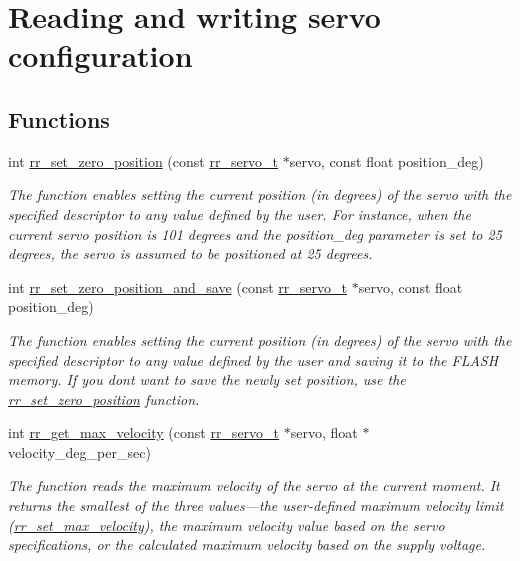 \hypertarget{group___config}{}\section{Reading and writing servo configuration}
\label{group___config}
\subsection*{Functions}
\begin{DoxyCompactItemize}
\item 
int \hyperlink{group___config_gab68e78b8a0d2a9ac38b9a72d78acab85}{rr\+\_\+set\+\_\+zero\+\_\+position} (const \hyperlink{structrr__servo__t}{rr\+\_\+servo\+\_\+t} $\ast$servo, const float position\+\_\+deg)
\begin{DoxyCompactList}\small\item\em The function enables setting the current position (in degrees) of the servo with the specified descriptor to any value defined by the user. For instance, when the current servo position is 101 degrees and the \textquotesingle{}position\+\_\+deg\textquotesingle{} parameter is set to 25 degrees, the servo is assumed to be positioned at 25 degrees. \end{DoxyCompactList}\item 
int \hyperlink{group___config_ga7ccc75e00e431b8a57150a71791488c3}{rr\+\_\+set\+\_\+zero\+\_\+position\+\_\+and\+\_\+save} (const \hyperlink{structrr__servo__t}{rr\+\_\+servo\+\_\+t} $\ast$servo, const float position\+\_\+deg)
\begin{DoxyCompactList}\small\item\em The function enables setting the current position (in degrees) of the servo with the specified descriptor to any value defined by the user and saving it to the F\+L\+A\+SH memory. If you don\textquotesingle{}t want to save the newly set position, use the \hyperlink{group___config_gab68e78b8a0d2a9ac38b9a72d78acab85}{rr\+\_\+set\+\_\+zero\+\_\+position} function.~\newline
 \end{DoxyCompactList}\item 
int \hyperlink{group___config_gad388cd353b262b614b563b093d61c911}{rr\+\_\+get\+\_\+max\+\_\+velocity} (const \hyperlink{structrr__servo__t}{rr\+\_\+servo\+\_\+t} $\ast$servo, float $\ast$velocity\+\_\+deg\+\_\+per\+\_\+sec)
\begin{DoxyCompactList}\small\item\em The function reads the maximum velocity of the servo at the current moment. It returns the smallest of the three values—the user-\/defined maximum velocity limit (\hyperlink{group___config_ga18d5d9dc728f7cb8e7674b9e9b275aca}{rr\+\_\+set\+\_\+max\+\_\+velocity}), the maximum velocity value based on the servo specifications, or the calculated maximum velocity based on the supply voltage. \end{DoxyCompactList}\item 

\end{DoxyCompactItemize}

